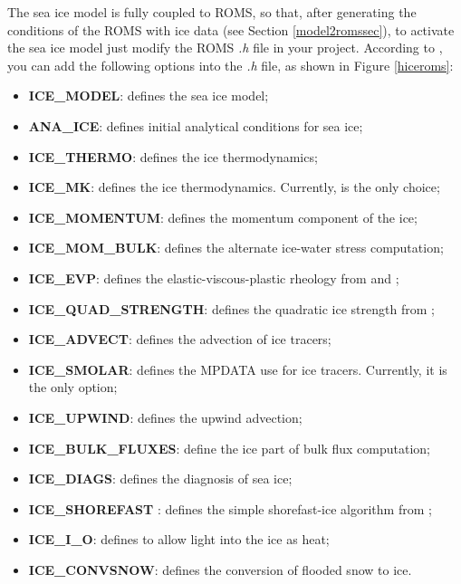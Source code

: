 \noindent The sea ice model is fully coupled to ROMS, so that, after generating the conditions of the
ROMS with ice data (see Section \textcolor{bleu_cite}{\ref{model2romssec}}), to activate the sea ice model 
just modify the ROMS \textit{.h} file in your project. According to \textcite{hedstrom2018}, you can
add the following options into the \textit{.h} file, as shown in Figure \textcolor{bleu_cite}{\ref{hiceroms}}:
\bigskip

\begin{itemize}
    \item \textbf{ICE\_MODEL}: defines the sea ice model;
    \item \textbf{ANA\_ICE}: defines initial analytical conditions for sea ice;
    \item \textbf{ICE\_THERMO}: defines the ice thermodynamics;
    \item \textbf{ICE\_MK}: defines the \textcite{Mellor1989} ice thermodynamics. Currently, is the only choice;
    \item \textbf{ICE\_MOMENTUM}: defines the momentum component of the ice;
    \item \textbf{ICE\_MOM\_BULK}: defines the alternate ice-water stress computation;
    \item \textbf{ICE\_EVP}: defines the elastic-viscous-plastic rheology from \textcite{Hunke1997} and \textcite{Hunke2001};
    \item \textbf{ICE\_QUAD\_STRENGTH}: defines the quadratic ice strength from \textcite{Overland1988};
    \item \textbf{ICE\_ADVECT}: defines the advection of ice tracers;
    \item \textbf{ICE\_SMOLAR}: defines the MPDATA use for ice tracers. Currently, it is the only option;
    \item \textbf{ICE\_UPWIND}: defines the upwind advection;
    \item \textbf{ICE\_BULK\_FLUXES}: define the ice part of bulk flux computation;
    \item \textbf{ICE\_DIAGS}: defines the diagnosis of sea ice;
    \item \textbf{ICE\_SHOREFAST} : defines the simple shorefast-ice algorithm from \textcite{Budgell2005};
    \item \textbf{ICE\_I\_O}: defines to allow light into the ice as heat;
    \item \textbf{ICE\_CONVSNOW}: defines the conversion of flooded snow to ice.
\end{itemize}
\bigskip

